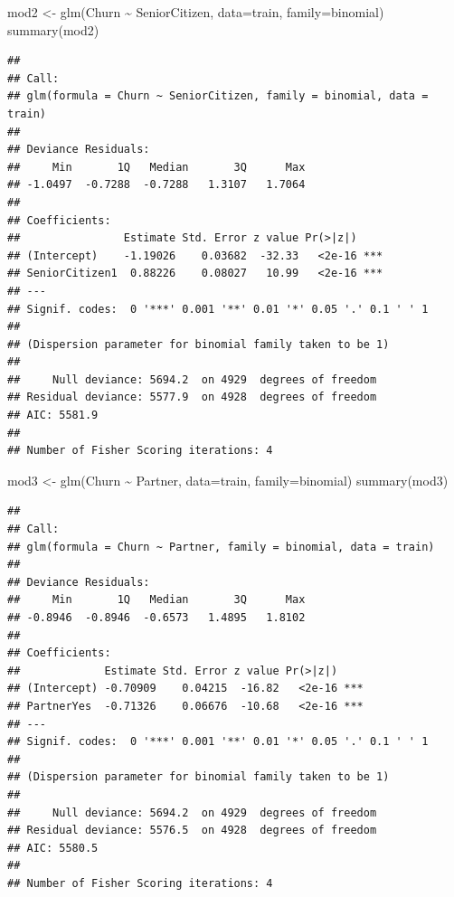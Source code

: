 \documentclass[
  twoside]{article}
\newenvironment{Shaded}{\begin{snugshade}}{\end{snugshade}}
\newcommand{\AttributeTok}[1]{\textcolor[rgb]{0.77,0.63,0.00}{#1}}
\newcommand{\FunctionTok}[1]{\textcolor[rgb]{0.00,0.00,0.00}{#1}}
\newcommand{\NormalTok}[1]{#1}
\newcommand{\OtherTok}[1]{\textcolor[rgb]{0.56,0.35,0.01}{#1}}
\newcommand{\SpecialCharTok}[1]{\textcolor[rgb]{0.00,0.00,0.00}{#1}}
\begin{document}
\begin{Shaded}
\begin{Highlighting}[]
\NormalTok{mod2 }\OtherTok{\textless{}{-}} \FunctionTok{glm}\NormalTok{(Churn }\SpecialCharTok{\textasciitilde{}}\NormalTok{ SeniorCitizen, }\AttributeTok{data=}\NormalTok{train, }\AttributeTok{family=}\NormalTok{binomial)}
\FunctionTok{summary}\NormalTok{(mod2)}
\end{Highlighting}
\end{Shaded}

\begin{verbatim}
## 
## Call:
## glm(formula = Churn ~ SeniorCitizen, family = binomial, data = train)
## 
## Deviance Residuals: 
##     Min       1Q   Median       3Q      Max  
## -1.0497  -0.7288  -0.7288   1.3107   1.7064  
## 
## Coefficients:
##                Estimate Std. Error z value Pr(>|z|)    
## (Intercept)    -1.19026    0.03682  -32.33   <2e-16 ***
## SeniorCitizen1  0.88226    0.08027   10.99   <2e-16 ***
## ---
## Signif. codes:  0 '***' 0.001 '**' 0.01 '*' 0.05 '.' 0.1 ' ' 1
## 
## (Dispersion parameter for binomial family taken to be 1)
## 
##     Null deviance: 5694.2  on 4929  degrees of freedom
## Residual deviance: 5577.9  on 4928  degrees of freedom
## AIC: 5581.9
## 
## Number of Fisher Scoring iterations: 4
\end{verbatim}

\begin{Shaded}
\begin{Highlighting}[]
\NormalTok{mod3 }\OtherTok{\textless{}{-}} \FunctionTok{glm}\NormalTok{(Churn }\SpecialCharTok{\textasciitilde{}}\NormalTok{ Partner, }\AttributeTok{data=}\NormalTok{train, }\AttributeTok{family=}\NormalTok{binomial)}
\FunctionTok{summary}\NormalTok{(mod3)}
\end{Highlighting}
\end{Shaded}

\begin{verbatim}
## 
## Call:
## glm(formula = Churn ~ Partner, family = binomial, data = train)
## 
## Deviance Residuals: 
##     Min       1Q   Median       3Q      Max  
## -0.8946  -0.8946  -0.6573   1.4895   1.8102  
## 
## Coefficients:
##             Estimate Std. Error z value Pr(>|z|)    
## (Intercept) -0.70909    0.04215  -16.82   <2e-16 ***
## PartnerYes  -0.71326    0.06676  -10.68   <2e-16 ***
## ---
## Signif. codes:  0 '***' 0.001 '**' 0.01 '*' 0.05 '.' 0.1 ' ' 1
## 
## (Dispersion parameter for binomial family taken to be 1)
## 
##     Null deviance: 5694.2  on 4929  degrees of freedom
## Residual deviance: 5576.5  on 4928  degrees of freedom
## AIC: 5580.5
## 
## Number of Fisher Scoring iterations: 4
\end{verbatim}
\end{document}

